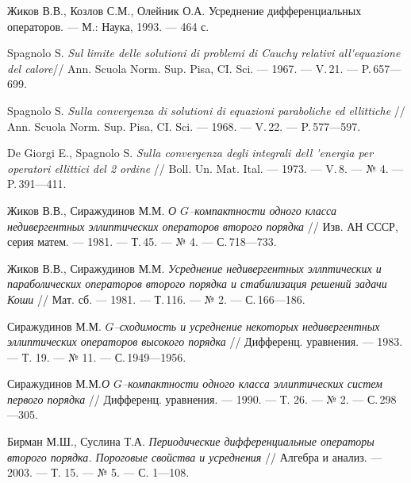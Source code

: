 \begin{thebibliography}{111}

Жиков В.В., Козлов С.М., Олейник О.А. {Усреднение дифференциальных
операторов}. --- М.: Наука, 1993. --- 464 с.



Spagnolo S. \emph{Sul limite delle solutioni di problemi di Cauchy
relativi all\'{}equazione del calore}// Ann. Scuola Norm. Sup. Pisa, CI. Sci. --- 1967. --- V.\,21. --- P.\,657---699.



Spagnolo S. \emph{Sulla convergenza di solutioni di equazioni paraboliche ed ellittiche
} // Ann. Scuola Norm. Sup. Pisa, CI. Sci. --- 1968. --- V.\,22. --- P.\,577---597.



De Giorgi E., Spagnolo S. \emph{Sulla convergenza degli integrali dell \'{}energia
per operatori ellittici del 2 ordine} // Boll. Un. Mat. Ital. --- 1973. --- V.\,8. --- № 4. --- P.\,391---411.



Жиков В.В., Сиражудинов М.М. \emph{О $G$--компактности одного класса недивергентных
эллиптических операторов второго порядка} // Изв. АН СССР, серия матем.
--- 1981. --- Т.\,45. --- № 4. --- С.\,718---733.



Жиков В.В., Сиражудинов М.М. \emph{Усреднение недивергентных эллптических и
параболических операторов второго порядка и стабилизация решений задачи Коши} //
Мат. сб. --- 1981. --- Т.\,116. --- № 2. --- С.\,166---186.



Сиражудинов М.М. \emph{$G$--сходимость и усреднение некоторых недивергентных
эллиптических операторов высокого порядка} // Дифференц. уравнения. --- 1983.
--- Т. 19. --- № 11. --- С.\,1949---1956.



Сиражудинов М.М.\emph{О $G$--компактности одного класса эллиптических систем первого
порядка} // Дифференц. уравнения. --- 1990. --- Т. 26. --- № 2. --- С.\,298---305.



Бирман М.Ш.,  Суслина Т.А.
\emph{Периодические дифференциальные операторы второго порядка.
Пороговые свойства и усреднения} //
Алгебра и анализ. --- 2003. --- Т. 15. --- № 5. --- С. 1---108.





\end{thebibliography}
